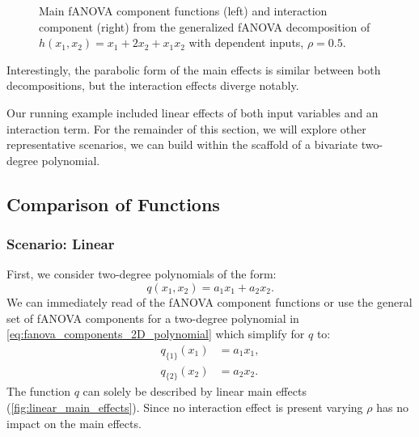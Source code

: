 \begin{figure}[htpb]
\begin{subfigure}[t]{0.49\textwidth}
    \end{subfigure}
    \caption{Main fANOVA component functions (left) and interaction component (right) from the generalized fANOVA decomposition of $h(x_1, x_2) = x_1 + 2 x_2 + x_1 x_2$ with dependent inputs, $\rho = 0.5$.}
    \label{fig:running_ex_dependent}
\end{figure}
Interestingly, the parabolic form of the main effects is similar between both decompositions, but the interaction effects diverge notably.\par
Our running example included linear effects of both input variables and an interaction term. For the remainder of this section, we will explore other representative scenarios, we can build within the scaffold of a bivariate two-degree polynomial.

\subsection{Comparison of Functions}
\subsubsection{Scenario: Linear}
First, we consider two-degree polynomials of the form:
$$q(x_1, x_2) = a_1 x_1 + a_2 x_2.$$
We can immediately read of the fANOVA component functions or use the general set of fANOVA components for a two-degree polynomial in \autoref{eq:fanova_components_2D_polynomial} which simplify for $q$ to:
\begin{align*}
    q_{\{1\}}(x_1) &= a_1 x_1, \\
    q_{\{2\}}(x_2) &= a_2 x_2.
\end{align*}
The function $q$ can solely be described by linear main effects (\autoref{fig:linear_main_effects}). Since no interaction effect is present varying $\rho$ has no impact on the main effects.


